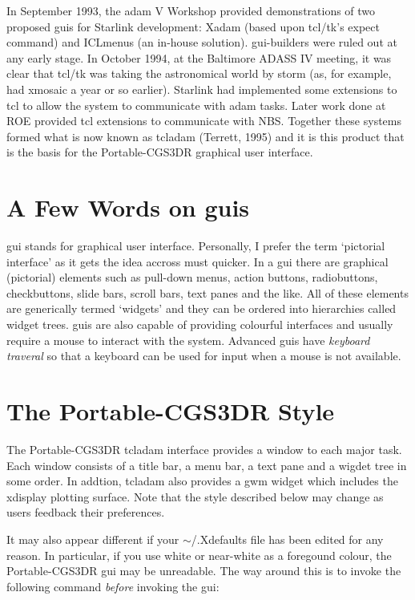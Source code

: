 \documentclass[a4paper]{book}
\renewcommand{\_}{{\tt\char'137}}
\begin{document}
In September 1993, the {\sc adam} V Workshop provided demonstrations of two
proposed {\sc gui}s for Starlink development: Xadam (based upon tcl/tk's expect
command) and ICLmenus (an in-house solution). {\sc gui}-builders were ruled out
at any early stage. In October 1994, at the Baltimore ADASS IV meeting, it
was clear that tcl/tk was taking the astronomical world by storm (as, for
example, had xmosaic a year or so earlier). Starlink had implemented some
extensions to tcl to allow the system to communicate with {\sc adam} tasks.
Later work done at ROE provided tcl extensions to communicate with NBS.
Together these systems formed what is now known as {\sc tcladam} (Terrett, 1995)
and it is this product that is the basis for the Portable-CGS3DR graphical
user interface.

\section{A Few Words on {\sc gui}s}
{\sc gui} stands for graphical user interface. Personally, I prefer the term
`pictorial interface' as it gets the idea accross must quicker. In a {\sc gui}
there are graphical (pictorial) elements such as pull-down menus, action
buttons, radiobuttons, checkbuttons, slide bars, scroll bars, text panes
and the like. All of these elements are generically termed `widgets' and
they can be ordered into hierarchies called widget trees. {\sc gui}s are also
capable of providing colourful interfaces and usually require a mouse to
interact with the system. Advanced {\sc gui}s have {\em keyboard traveral} so
that a keyboard can be used for input when a mouse is not available.

\section{The Portable-CGS3DR Style}
The Portable-CGS3DR {\sc tcladam} interface provides a window to each major
task. Each window consists of a title bar, a menu bar, a text pane and a
wigdet tree in some order. In addtion, {\sc tcladam} also provides a {\sc gwm} widget
which includes the xdisplay plotting surface. Note that the style described
below may change as users feedback their preferences.

It may also appear different if your $\sim$/.Xdefaults file has been edited for any reason.
In particular, if you use white or near-white as a foregound colour, the Portable-CGS3DR
{\sc gui} may be unreadable. The way around this is to invoke the following command
{\em before} invoking the {\sc gui}:
\end{document}
